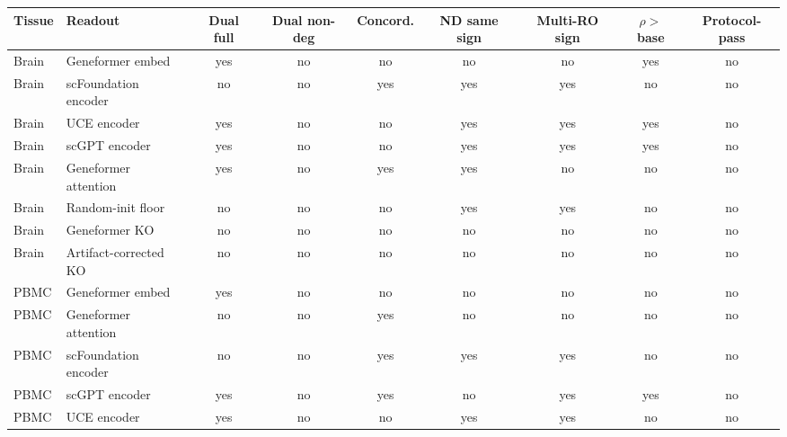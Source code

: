 \begin{tabular}{llccccccc}
\toprule
Tissue & Readout & Dual full & Dual non-deg & Concord. & ND same sign & Multi-RO sign & $\rho>$ base & Protocol-pass \\ 
\midrule
Brain & Geneformer embed & yes & no & no & no & no & yes & no \\
Brain & scFoundation encoder & no & no & yes & yes & yes & no & no \\
Brain & UCE encoder & yes & no & no & yes & yes & yes & no \\
Brain & scGPT encoder & yes & no & no & yes & yes & yes & no \\
Brain & Geneformer attention & yes & no & yes & yes & no & no & no \\
Brain & Random-init floor & no & no & no & yes & yes & no & no \\
Brain & Geneformer KO & no & no & no & no & no & no & no \\
Brain & Artifact-corrected KO & no & no & no & no & no & no & no \\
PBMC & Geneformer embed & yes & no & no & no & no & no & no \\
PBMC & Geneformer attention & no & no & yes & no & no & no & no \\
PBMC & scFoundation encoder & no & no & yes & yes & yes & no & no \\
PBMC & scGPT encoder & yes & no & yes & no & yes & yes & no \\
PBMC & UCE encoder & yes & no & no & yes & yes & no & no \\
\bottomrule
\end{tabular}
